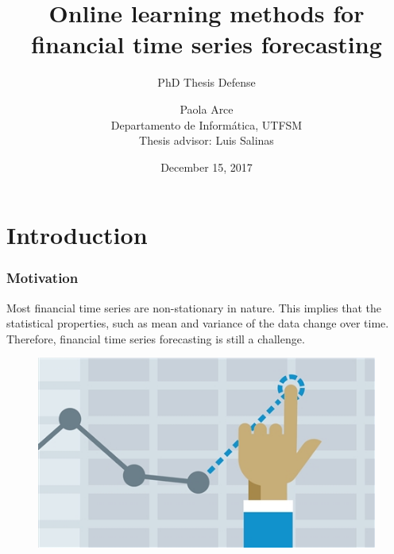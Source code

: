 \documentclass{beamer}
\author[Paola Arce]{Paola Arce \\ Departamento de Inform\'atica, UTFSM \\ Thesis advisor: Luis Salinas}
\date{December 15, 2017}
\title[Thesis defense]{Online learning methods for financial time series forecasting}
\subtitle{PhD Thesis Defense}
\begin{document}
\begin{frame}[plain]
\titlepage
\end{frame}



\section{Introduction}

\begin{frame}
\frametitle{Motivation}
Most financial time series are non-stationary in nature. This implies that the statistical properties, such as mean and variance of the data change over time. Therefore, financial time series forecasting is still a challenge.
\begin{figure}
\includegraphics[width=0.4\paperwidth]{img/forecast}
\end{figure}

\end{frame}
\end{document}
